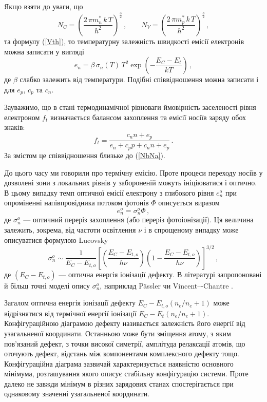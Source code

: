Якщо взяти до уваги, що
\begin{equation}
\label{Ncv}
N_C=\left(\frac{2\,\pi m_n^*\,k\,T}{h^2}\right)^{\frac{3}{2}}\,,\qquad N_V=\left(\frac{2\,\pi m_p^*\,k\,T}{h^2}\right)^{\frac{3}{2}}\,,
\end{equation}
та формулу (\ref{Vth}),
то температурну залежність швидкості емісії електронів можна записати у вигляді
\begin{equation}
\label{enT}
e_n=\beta\,\sigma_n(T)\,T^2 \exp\left(-\frac{E_C-E_t}{kT}\right)\,,
\end{equation}
де $\beta$ слабко залежить від температури.
Подібні співвідношення можна записати і для $e_p$, $c_p$ та $c_n$.

Зауважимо, що в стані термодинамічної рівноваги ймовірність заселеності рівня електроном $f_t$
визначається балансом захоплення та емісії носіїв заряду обох знаків:
\begin{equation}
\label{ft}
f_t=\frac{c_nn+e_p}{e_n+c_pp+c_nn+e_p}\,.
\end{equation}
За змістом це співвідношення близьке до (\ref{NbNa}).

До цього часу ми говорили про термічну емісію.
Проте процеси переходу носіїв у дозволені зони з локальних рівнів
у забороненій можуть ініціюватися і оптично.
В цьому випадку темп оптичної емісії електрону з глибокого рівня $e_n^o$
при опроміненні напівпровідника потоком фотонів $\Phi$ описується виразом
\begin{equation}
\label{enO}
e_n^o=\sigma_n^o\Phi\,,
\end{equation}
де
$\sigma_n^o$ --- оптичний переріз захоплення (або переріз фотоіонізації).
Ця величина залежить, зокрема, від частоти освітлення $\nu$ і в спрощеному випадку може
описуватися формулою Lucovsky \cite{tuomisto2019}
\begin{equation}
\label{SnO}
\sigma_n^o\sim \frac{1}{E_C-E_{t,o}} \left[\left(\frac{E_C-E_{t,o}}{h\nu}\right)\left(1-\frac{E_C-E_{t,o}}{h\nu}\right)\right]^{3/2}\,,
\end{equation}
де $(E_C-E_{t,o})$ --- оптична енергія іонізації дефекту.
В літературі запропоновані й більш точні моделі опису $\sigma_n^o$,
наприклад P\"{a}ssler \cite{Pasler_op} чи Vincent–-Chantre \cite{Chantre_op}.

Загалом оптична енергія іонізації дефекту $E_C-E_{t,o}(n_e/n_e+1)$ може
відрізнятися від термічної енергії іонізації $E_C-E_{t}(n_e/n_e+1)$.
Конфігураційною діаграмою дефекту називається залежність його енергії
від узагальненої координати.
Останньою може бути зміщення атому, з яким пов'язаний дефект,
з точки високої симетрії, амплітуда релаксації атомів, що оточують дефект,
відстань між компонентами комплексного дефекту тощо.
Конфігураційна діаграма зазвичай характеризується наявністю основного мінімума,
розташування якого описує стабільну конфігурацію системи.
Проте далеко не завжди мінімум в різних зарядових станах спостерігається при
однаковому значенні узагальненої координати.

